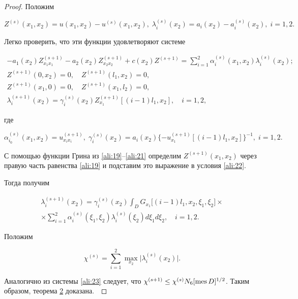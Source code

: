 \begin{proof} Положим 

$$

Z^{(s)}(x_1,x_2)=u(x_1,x_2)-u^{(s)}(x_1,x_2), \; \lambda_{i}^{(s)}(x_2)=a_i(x_2)-a_i^{(s)}(x_2), \; i=1, 2.

$$

Легко проверить, что эти функции удовлетворяют системе 

\begin{gather}

\label{ali:19}

-a_1(x_2)Z_{x_1x_1}^{(s+1)}-a_2(x_2)Z_{x_2x_2}^{(s+1)}+c(x_2)Z^{(s+1)}{=}\sum\limits_{i=1}^2\alpha_i^{(s)}(x_1,x_2)\lambda_i^{(s)}(x_2);

\\

\label{ali:21}

Z^{(s+1)}(0,x_2)=0, \quad Z^{(s+1)}(l_1,x_2)=0,

\\

\label{ali:21}

Z^{(s+1)}(x_1,0)=0, \quad Z^{(s+1)}(x_1,l_2)=0,

\\

\label{ali:22}

\lambda_i^{(s+1)}(x_2)=\gamma_i^{(s)}(x_2)Z_{x_1}^{(s+1)}[(i-1)l_1,x_2], \quad i=1, 2,

\end{gather}

где 

$

\alpha_{i_0}^{(s)}(x_1,x_2)=u_{x_ix_i}^{(s+1)}, \; \gamma_i^{(s)}(x_2)=a_i(x_2)\{-u_{x_1}^{(s+1)}[(i-1)l_1,x_2]\}^{-1}, \; i=1, 2.

$



С помощью функции Грина из \eqref{ali:19}--\eqref{ali:21} определим $Z^{(s+1)}(x_1,x_2)$ через правую часть равенства \eqref{ali:19} и подставим это выражение в условия \eqref{ali:22}. 

Тогда получим

\begin{multline}

\label{ali:23}

\lambda_i^{(s+1)}(x_2)=\gamma_i^{(s)}(x_2)\int_D G_{x_1}\bigl[(i-1)l_1,x_2,\xi_1,\xi_2\bigr]\times \\

\times \sum\limits_{i=1}^2\alpha_i^{(s)}(\xi_1,\xi_2)\lambda_i^{(s)}(\xi_2)d\xi_1d\xi_2,  \quad 

i = 1, 2.

\end{multline}



Положим 

$$

\chi^{(s)}=\sum\limits_{i=1}^2\max\limits_{x_2}\bigl|\lambda_i^{(s)}(x_2)\bigr|

.$$

 Аналогично из системы \eqref{ali:23} следует, что  $\chi^{(s+1)}\le\chi^{(s)}N_6[\mathop{\rm mes}D]^{1/2}$. Таким образом, теорема \hyperlink{ali:thm2}{2} доказана.~\end{proof}

